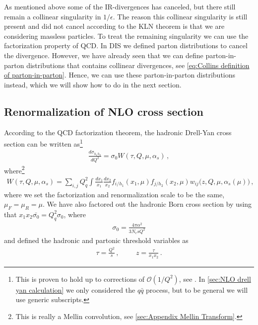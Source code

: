 As mentioned above some of the IR-divergences has canceled, but there still remain a collinear singularity in $1/\epsilon$. The reason this collinear singularity is still present and did not cancel according to the KLN theorem is that we are considering massless particles. To treat the remaining singularity we can use the factorization property of QCD. In DIS we defined  parton distributions to cancel the divergence. However, we have already seen that we can define parton-in-parton distributions that contains collinear divergences, see \cref{eq:Collins definition of parton-in-parton}. Hence, we can use these parton-in-parton distributions instead, which we will show how to do in the next section.


\subsection{Renormalization of NLO cross section}\label{sec:renormalizing drell-yan}
According to the QCD factorization theorem, the hadronic Drell-Yan cross section can be written as\footnote{This is proven to hold up to corrections of $\mathcal{O}(1/Q^{2})$, see \cite{Collins:1989gx}. In \cref{sec:NLO drell yan calculation} we only considered the $q\bar{q}$ process, but to be general we will use generic subscripts.}
\begin{align}\label{eq:Factorized hadronic Dre-Yan}
   \frac{ d\sigma_{h_1h_2}}{dQ^{2}}=\sigma_{0}W(\tau,Q,\mu,\alpha_s)\,,
\end{align}
where\footnote{This is really a Mellin convolution, see \cref{sec:Appendix Mellin Transform}.}
\begin{align}\label{eq:hadronic convolution}
    W(\tau,Q,\mu,\alpha_s)=\sum_{i,j}Q_{q}^{2}\int \frac{dx_{1}}{x_1}\frac{dx_{2}}{x_2}f_{i/h_1}(x_1,\mu)f_{j/h_2}(x_2,\mu)w_{ij}\Big(z,Q,\mu,\alpha_{s}(\mu)\Big)\,,
\end{align}
where we set the factorization and renormalization scale to be the same, $\mu_F=\mu_R=\mu$. We have also factored out the hadronic Born cross section by using that $x_{1}x_{2}\bar{\sigma_{0}}=Q_{q}^{2}\sigma_{0}$, where
\begin{align}
    \sigma_{0}=\frac{4\pi\alpha^{2}}{3N_{c}sQ^{2}}
\end{align}
and defined the hadronic and partonic threshold variables as
\begin{align}
    \tau=\frac{Q^{2}}{s}\,,\hspace{1cm}z=\frac{\tau}{x_{1}x_{2}}\,.
\end{align}

